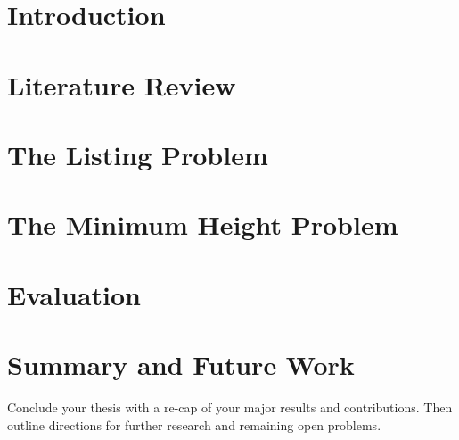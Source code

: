 



\chapter{Introduction}
\label{chapter:intro}









\chapter{Literature Review}
\label{chapter:LitReview}



\chapter{The Listing Problem}  
\label{chapter:listingproblem}





\chapter{The Minimum Height Problem}
\label{chapter:minheightproblem}






\chapter{Evaluation}  
\label{chapter:evaluation}



\chapter{Summary and Future Work}
\label{chapter:summary}

Conclude your thesis with a re-cap of your major results and contributions.  Then outline directions for further research and remaining open problems.

